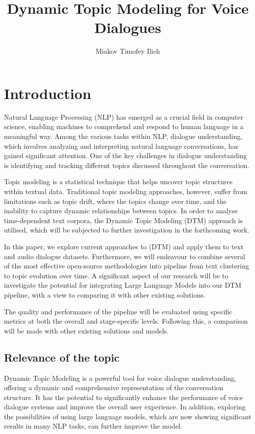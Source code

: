 \documentclass[PMI,VKR]{HSEUniversity}
\title{Dynamic Topic Modeling for Voice Dialogues}
\author{Miakov Timofey Ilich}
\begin{document}
\maketitle

\chapter{Introduction}

Natural Language Processing (NLP) has emerged as a crucial field in computer science, enabling machines to comprehend and respond to human language in a meaningful way. 
Among the various tasks within NLP, dialogue understanding, which involves analyzing and interpreting natural language conversations, has gained significant attention. 
One of the key challenges in dialogue understanding is identifying and tracking different topics discussed throughout the conversation.

Topic modeling is a statistical technique that helps uncover topic structures within textual data. 
Traditional topic modeling approaches, however, suffer from limitations such as topic drift, where the topics change over time, and the inability to capture dynamic relationships between topics. 
In order to analyse time-dependent text corpora, the Dynamic Topic Modeling (DTM) approach is utilised, which will be subjected to further investigation in the forthcoming work.

In this paper, we explore current approaches to (DTM) and apply them to text and audio dialogue datasets. 
Furthermore, we will endeavour to combine several of the most effective open-source methodologies into pipeline from text clustering to topic evolution over time. 
A significant aspect of our research will be to investigate the potential for integrating Large Language Models into our DTM pipeline, with a view to comparing it with other existing solutions.

The quality and performance of the pipeline will be evaluated using specific metrics at both the overall and stage-specific levels. Following this, a comparison will be made with other existing solutions and models.



\section{Relevance of the topic}

Dynamic Topic Modeling is a powerful tool for voice dialogue understanding, offering a dynamic and comprehensive representation of the conversation structure. 
It has the potential to significantly enhance the performance of voice dialogue systems and improve the overall user experience.
In addition, exploring the possibilities of using large language models, which are now showing significant results in many NLP tasks, can further improve the model.
\end{document}
